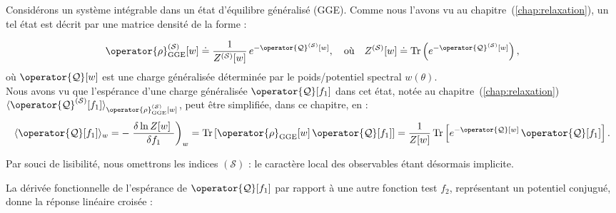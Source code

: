 
Considérons un système intégrable dans un état d’équilibre généralisé (GGE). Comme nous l'avons vu au chapitre~(\ref{chap:relaxation}), un tel état est décrit par une matrice densité de la forme :

\begin{eqnarray*}
	\operator{\rho}_{\mathrm{GGE}}^{(\mathcal{S})}[w] \doteq  \frac{1}{Z^{(\mathcal{S})}[w]}\, e^{-\operator{\mathcal{Q}}^{(\mathcal{S})}[w]},\quad \text{où} \quad Z^{(\mathcal{S})}[w] \doteq \mathrm{Tr}\left(e^{-\operator{\mathcal{Q}}^{(\mathcal{S})}[w]}\right),
\end{eqnarray*}
où \( \operator{\mathcal{Q}}[w] \) est une charge généralisée déterminée par le poids/potentiel spectral \( w(\theta) \).\\

Nous avons vu que l'espérance d'une charge généralisée \( \operator{\mathcal{Q}}[f_1] \) dans cet état, notée au chapitre~(\ref{chap:relaxation}) \( \langle \operator{\mathcal{Q}}^{(\mathcal{S})}[f_1] \rangle_{\operator{\rho}_{\mathrm{GGE}}^{(\mathcal{S})}[w]} \), peut être simplifiée, dans ce chapitre, en :
\begin{eqnarray*}
	\langle \operator{\mathcal{Q}}[f_1] \rangle_w =  -  \left . \frac{ \delta \ln Z [w] }{ \delta f_1  } \right)_{w}  = \mathrm{Tr} \left[ \operator{\rho}_{\mathrm{GGE}}[w]\, \operator{\mathcal{Q}}[f_1] \right]
= \frac{1}{Z[w]}\, \mathrm{Tr} \left[ e^{-\operator{\mathcal{Q}}[w]}\, \operator{\mathcal{Q}}[f_1] \right] .	
\end{eqnarray*}

Par souci de lisibilité, nous omettrons les indices \((\mathcal{S})\) : le caractère local des observables étant désormais implicite.



\medskip

La dérivée fonctionnelle de l'espérance de \( \operator{\mathcal{Q}}[f_1] \) par rapport à une autre fonction test \( f_2 \), représentant un potentiel conjugué, donne la réponse linéaire croisée :

